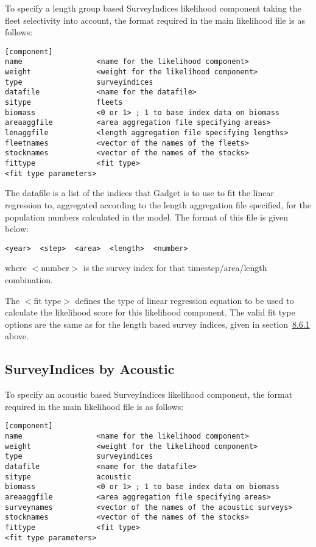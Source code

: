\documentclass[]{book}
\begin{document}
To specify a length group based SurveyIndices likelihood component
taking the fleet selectivity into account, the format required in the
main likelihood file is as follows:

\begin{verbatim}
[component]
name                 <name for the likelihood component>
weight               <weight for the likelihood component>
type                 surveyindices
datafile             <name for the datafile>
sitype               fleets
biomass              <0 or 1> ; 1 to base index data on biomass
areaaggfile          <area aggregation file specifying areas>
lenaggfile           <length aggregation file specifying lengths>
fleetnames           <vector of the names of the fleets>
stocknames           <vector of the names of the stocks>
fittype              <fit type>
<fit type parameters>
\end{verbatim}

The datafile is a list of the indices that Gadget is to use to fit the
linear regression to, aggregated according to the length aggregation
file specified, for the population numbers calculated in the model. The
format of this file is given below:

\begin{verbatim}
<year>  <step>  <area>  <length>  <number>
\end{verbatim}

where \(<\)number\(>\) is the survey index for that timestep/area/length
combination.

The \(<\)fit type\(>\) defines the type of linear regression equation to be
used to calculate the likelihood score for this likelihood component.
The valid fit type options are the same as for the length based survey
indices, given in
section~\protect\hyperlink{subsec:sibylength}{8.6.1} above.

\hypertarget{subsec:sibyacoustic}{%
\subsection{SurveyIndices by Acoustic}\label{subsec:sibyacoustic}}

To specify an acoustic based SurveyIndices likelihood component, the
format required in the main likelihood file is as follows:

\begin{verbatim}
[component]
name                 <name for the likelihood component>
weight               <weight for the likelihood component>
type                 surveyindices
datafile             <name for the datafile>
sitype               acoustic
biomass              <0 or 1> ; 1 to base index data on biomass
areaaggfile          <area aggregation file specifying areas>
surveynames          <vector of the names of the acoustic surveys>
stocknames           <vector of the names of the stocks>
fittype              <fit type>
<fit type parameters>
\end{verbatim}
\end{document}
